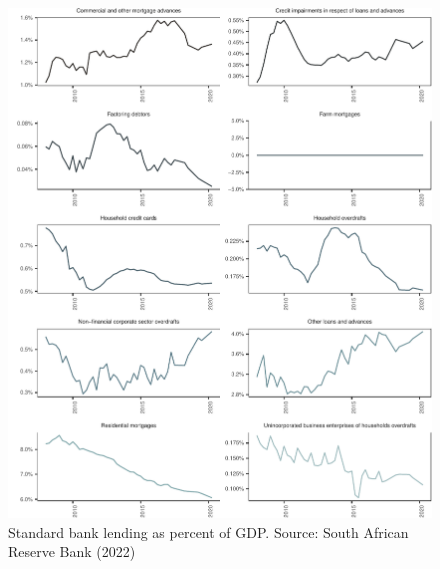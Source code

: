 \documentclass[
]{article}
\begin{document}
\begin{figure}[H]

\includegraphics{Bank_capital_and_bank_lending_files/figure-latex/ba900gdpstandard-1} \hfill{}

\caption{Standard bank lending as percent of GDP. Source: South African Reserve Bank (2022)}\label{fig:ba900gdpstandard}
\end{figure}
\end{document}
